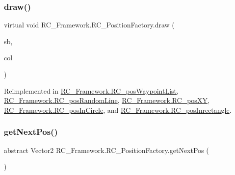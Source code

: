 \subsubsection{\texorpdfstring{draw()}{draw()}}
{\footnotesize\ttfamily virtual void R\+C\+\_\+\+Framework.\+R\+C\+\_\+\+Position\+Factory.\+draw (\begin{DoxyParamCaption}\item[{Sprite\+Batch}]{sb,  }\item[{Color}]{col }\end{DoxyParamCaption})\hspace{0.3cm}{\ttfamily [virtual]}}



Reimplemented in \mbox{\hyperlink{class_r_c___framework_1_1_r_c__pos_waypoint_list_ae0bea3900f15e35e022f9b1d5c409067}{R\+C\+\_\+\+Framework.\+R\+C\+\_\+pos\+Waypoint\+List}}, \mbox{\hyperlink{class_r_c___framework_1_1_r_c__pos_random_line_aa0c6137f7d33d80534376f2c4f9612e6}{R\+C\+\_\+\+Framework.\+R\+C\+\_\+pos\+Random\+Line}}, \mbox{\hyperlink{class_r_c___framework_1_1_r_c__pos_x_y_aaf344770b6a98b98937f4d43ffd536ef}{R\+C\+\_\+\+Framework.\+R\+C\+\_\+pos\+XY}}, \mbox{\hyperlink{class_r_c___framework_1_1_r_c__pos_in_circle_ad59a9527d30ddfa0b15c4210907d3051}{R\+C\+\_\+\+Framework.\+R\+C\+\_\+pos\+In\+Circle}}, and \mbox{\hyperlink{class_r_c___framework_1_1_r_c__pos_inrectangle_ab5a236d69d4dc284f825e4e4d28908ec}{R\+C\+\_\+\+Framework.\+R\+C\+\_\+pos\+Inrectangle}}.

\mbox{\label{class_r_c___framework_1_1_r_c___position_factory_aab6cd4cb6a10c8dfa126c4930c6a9fbf}} 
\subsubsection{\texorpdfstring{get\+Next\+Pos()}{getNextPos()}}
{\footnotesize\ttfamily abstract Vector2 R\+C\+\_\+\+Framework.\+R\+C\+\_\+\+Position\+Factory.\+get\+Next\+Pos (\begin{DoxyParamCaption}{ }\end{DoxyParamCaption})\hspace{0.3cm}{\ttfamily [pure virtual]}}



